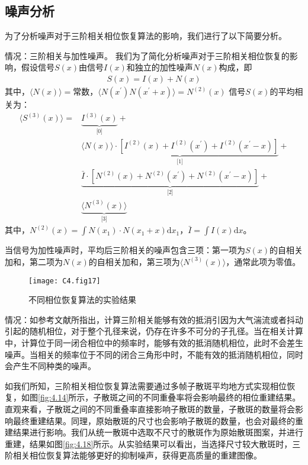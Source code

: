 \subsection{噪声分析}
为了分析噪声对于三阶相关相位恢复算法的影响，我们进行了以下简要分析。

情况：三阶相关与加性噪声。
我们为了简化分析噪声对于三阶相关相位恢复的影响，假设信号$S(x)$由信号$I(x)$和独立的加性噪声$N(x)$构成，即
\begin{equation}
\begin{aligned}
S(x) = I(x)+N(x)
\end{aligned}
\label{eq:4.20}
\end{equation}其中，$\langle N(x) \rangle = \mbox{常数} $，$\langle N(x^{\prime})  N(x^{\prime} +x) \rangle = N^{(2)}(x) $
信号$S(x)$的平均相关为：
\begin{equation}
\begin{aligned}
\langle S^{(3)}(x) \rangle = & \underbrace{I^{(3)}(x)}_{\text{[0]}}+\\
& \underbrace{\langle N(x)\rangle \cdot \left[ I^{(2)}(x) +I^{(2)}(x^{\prime}) +I^{(2)}(x^{\prime}-x) \right] }_{\text{[1]}}+\\
& \underbrace{ \bar{I} \cdot \left[ N^{(2)}(x) +N^{(2)}(x^{\prime}) +N^{(2)}(x^{\prime}-x) \right]}_{\text{[2]}}+\\
& \underbrace{\langle N^{(3)}(x)\rangle}_{\text{[3]}}
\end{aligned}
\label{eq:4.21}
\end{equation}其中，$N^{(2)}(x) = \int N(x_1) \cdot N(x_1+x) \mathrm{d}{x_1}$，$\bar{I} = \int I(x)\mathrm{d}{x}$。

当信号为加性噪声时，平均后三阶相关的噪声包含三项：第一项为$S(x)$的自相关加和，第二项为$N(x)$的自相关加和，第三项为$\langle N^{(3)}(x)\rangle$，通常此项为零值。

\begin{figure}[htp]
	\centering
	\texttt{[image: C4.fig17]}
	\caption{不同相位恢复算法的实验结果}
	\label{fig:4.17}
\end{figure}

情况：如参考文献\cite{lohmann_speckle_1983,wu_single-shot_2016}所指出，计算三阶相关能够有效的抵消引因为大气湍流或者抖动引起的随机相位，对于整个孔径来说，仍存在许多不可分的子孔径。当在相关计算中，计算位于同一闭合相位中的频率时，能够有效的抵消随机相位，此时不会差生噪声。当相关的频率位于不同的闭合三角形中时，不能有效的抵消随机相位，同时会产生不同种类的噪声。

如我们所知，三阶相关相位恢复算法需要通过多帧子散斑平均地方式实现相位恢复，如图\ref{fig:4.14}所示，子散斑之间的不同重叠率将会影响最终的相位重建结果。直观来看，子散斑之间的不同重叠率直接影响子散斑的数量，子散斑的数量将会影响最终重建结果。同理，原始散斑的尺寸也会影响子散斑的数量，也会对最终的重建结果进行影响。我们从统一散斑中选取不尺寸的散斑作为原始散斑图案，并进行重建，结果如图\ref{fig:4.18}所示。从实验结果可以看出，当选择尺寸较大散斑时，三阶相关相位恢复算法能够更好的抑制噪声，获得更高质量的重建图像。

